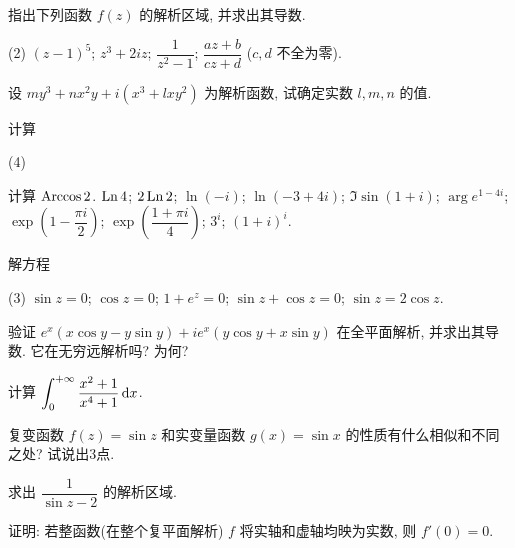 \begin{homework}
\begin{exlist}
      \item 指出下列函数 $f(z)$ 的解析区域, 并求出其导数.
        \begin{tasks}(2)
          \task $(z-1)^5$;
          \task $z^3+2iz$;
          \task $\dfrac1{z^2-1}$;
          \task $\dfrac{az+b}{cz+d}$ ($c,d$ 不全为零).
        \end{tasks}
      \item 设 $my^3+nx^2y+i(x^3+lxy^2)$ 为解析函数, 试确定实数 $l,m,n$ 的值.
      \item 计算
        \begin{tasks}(4)
          \item 计算 $\operatorname{Arccos} 2$.
          \task $\operatorname{Ln} 4$;
          \task $2\operatorname{Ln}2$;
          \task $\ln(-i)$;
          \task $\ln(-3+4i)$;
          \task $\Im\sin(1+i)$;
          \task $\arg e^{1-4i}$;
          \task $\exp\left(1-\dfrac{\pi i}2\right)$;
          \task $\exp\left(\dfrac{1+\pi i}4\right)$;
          \task $3^i$;
          \task $(1+i)^i$.
        \end{tasks}
      \item 解方程 
        \begin{tasks}(3)
          \task $\sin z=0$;
          \task $\cos z=0$;
          \task $1+e^z=0$;
          \task $\sin z+\cos z=0$;
          \task $\sin z=2\cos z$.
        \end{tasks}
      \item 验证 $e^x(x\cos y-y\sin y)+i e^x(y\cos y+x\sin y)$ 在全平面解析, 并求出其导数. 它在无穷远解析吗? 为何?

      \item 计算 $\displaystyle\int_0^{+\infty}\frac{x^2+1}{x^4+1}\,\mathrm{d} x$.
      \item 复变函数 $f(z)=\sin z$ 和实变量函数 $g(x)=\sin x$ 的性质有什么相似和不同之处? 试说出3点.
      \item 求出 $\dfrac{1}{\sin z-2}$ 的解析区域.
      \item 证明: 若整函数(在整个复平面解析) $f$ 将实轴和虚轴均映为实数, 则 $f'(0)=0$.
    \end{exlist}
\end{homework}
  

